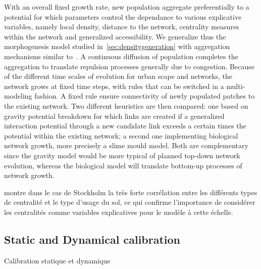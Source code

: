 With an overall fixed growth rate, new population aggregate preferentially to a potential for which parameters control the dependance to various explicative variables, namely local density, distance to the network, centrality measures within the network and generalized accessibility. We generalize thus the morphogenesis model studied in~\ref{sec:densitygeneration} with aggregation mechanisms similar to~\cite{raimbault2014hybrid}.
A continuous diffusion of population completes the aggregation to translate repulsion processes generally due to congestion. Because of the different time scales of evolution for urban scape and networks, the network grows at fixed time steps, with rules that can be switched in a multi-modeling fashion. A fixed rule ensure connectivity of newly populated patches to the existing network. Two different heuristics are then compared: one based on gravity potential breakdown for which links are created if a generalized interaction potential through a new candidate link exceeds a certain times the potential within the existing network; a second one implementing biological network growth, more precisely a slime mould model. Both are complementary since the gravity model would be more typical of planned top-down network evolution, whereas the biological model will translate bottom-up processes of network growth. 


\cite{doi:10.1080/13658816.2014.893347} montre dans le cas de Stockholm la très forte corrélation entre les différents types de centralité et le type d'usage du sol, ce qui confirme l'importance de considérer les centralités comme variables explicatives pour le modèle à cette échelle.





\subsection{Static and Dynamical calibration}{Calibration statique et dynamique}


